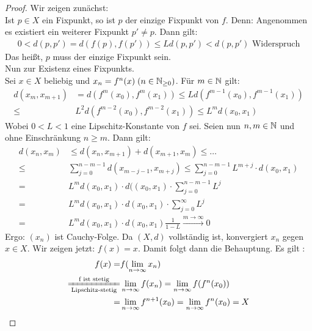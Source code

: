 \begin{proof}
	Wir zeigen zunächst: \\
	Ist $p \in X$ ein Fixpunkt, so ist $p$ der einzige Fixpunkt von $f$. 
	Denn: Angenommen es existiert ein weiterer Fixpunkt $p' \neq p$. Dann gilt:
	\begin{align*}
		0 < d(p,p')=d(f(p),f(p')) \leq L d(p,p') < d(p,p') \text{ Widerspruch}
	\end{align*}
	Das heißt, $p$ muss der einzige Fixpunkt sein. \\
	Nun zur Existenz eines Fixpunkts.\\
	Sei $x \in X$ beliebig und $x_n = f^n(x) \; (n \in \mathbb{N}_{\geq 0})$. 
	Für $m \in \mathbb{N}$ gilt:
	\begin{align*}
		d(x_m, x_{m+1})&= d(f^m(x_0),f^m(x_1)) \leq L d(f^{m-1}(x_0),f^{m-1}(x_1))\\
		\leq & L^2 d(f^{m-2}(x_0), f^{m-2}(x_1)) \leq L^m d(x_0,x_1)
	\end{align*}
	Wobei $0 < L < 1$ eine Lipschitz-Konstante von $f$ sei.
	Seien nun $n, m \in \mathbb{N}$ und ohne Einschränkung $n \geq m$. Dann gilt:
	\begin{align*}
	d(x_n,x_m) & \leq d(x_n,x_{m+1})+d(x_{m+1},x_m) \leq \hdots \\
	\leq & \sum_{j = 0}^{n-m-1} d(x_{m-j-1},x_{m+j}) 
	\leq \sum_{j=0}^{n-m-1} L^{m+j}\cdot d(x_0,x_1) \\ 
	= & L^m d(x_0,x_1) \cdot d((x_0,x_1) \cdot \sum_{j=0}^{n-m-1}  L^j \\
	= & L^m d(x_0,x_1) \cdot d(x_0,x_1) \cdot \sum_{j=0}^\infty L^j \\
	= & L^m d(x_0,x_1) \cdot d(x_0,x_1) \frac{1}{1-L}
	\xrightarrow{m \rightarrow \infty} 0
	\end{align*}
	Ergo: $(x_n)$ ist Cauchy-Folge. Da $(X,d)$ vollständig ist, konvergiert $x_n$ 
	gegen $x \in X$. Wir zeigen jetzt: $f(x) =x$.
	Damit folgt dann die Behauptung. Es gilt : 
	\begin{align*}
		f(x) = & f(\lim\limits_{n \rightarrow \infty}{x_n}) \\ \xlongequal[\text{Lipschitz-stetig}]{\text{f ist stetig}} & \lim\limits_{n \rightarrow \infty}{f(x_n)} = \lim\limits_{n\rightarrow \infty}{f(f^n(x_0))} \\
		 = & \lim\limits_{n \rightarrow \infty}{f^{n+1}(x_0)}
		= \lim\limits_{n \rightarrow \infty}{f^n(x_0)} = X
	\end{align*}			
\end{proof}